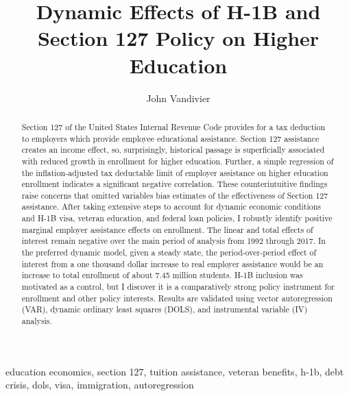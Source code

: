 \documentclass[review]{elsarticle}
\begin{document}
\begin{frontmatter}

    \title{
        Dynamic Effects of H-1B and Section 127 Policy on Higher Education
    }

    \author[mymainaddress]{John Vandivier} %
    \address[mymainaddress]{4400 University Dr, Fairfax, VA 22030}

    \begin{abstract}
        Section 127 of the United States Internal Revenue Code provides for a tax deduction to employers which provide employee educational assistance.
        Section 127 assistance creates an income effect, so, surprisingly,
        historical passage is superficially associated with reduced growth in enrollment for higher education.
        Further, a simple regression of the inflation-adjusted tax deductable limit of employer assistance on higher education enrollment indicates a significant negative correlation.
        These counterintuitive findings raise concerns that omitted variables bias estimates of the effectiveness of Section 127 assistance.
        After taking extensive steps to account for dynamic economic conditions and H-1B visa, veteran education, and federal loan policies,
        I robustly identify positive marginal employer assistance effects on enrollment.
        The linear and total effects of interest remain negative over the main period of analysis from 1992 through 2017.
        In the preferred dynamic model, given a steady state,
        the period-over-period effect of interest from a one thousand dollar increase to real employer assistance would be an increase to total enrollment of about 7.45 million students.
        H-1B inclusion was motivated as a control, but I discover it is a comparatively strong policy instrument for enrollment and other policy interests.
        Results are validated using vector autoregression (VAR), dynamic ordinary least squares (DOLS), and instrumental variable (IV) analysis.
    \end{abstract}

    \begin{keyword}
        education economics, section 127, tuition assistance, veteran benefits, h-1b, debt crisis, dols, visa, immigration, autoregression %
        \MSC[2010] %
    \end{keyword}
\end{frontmatter}
\end{document}
